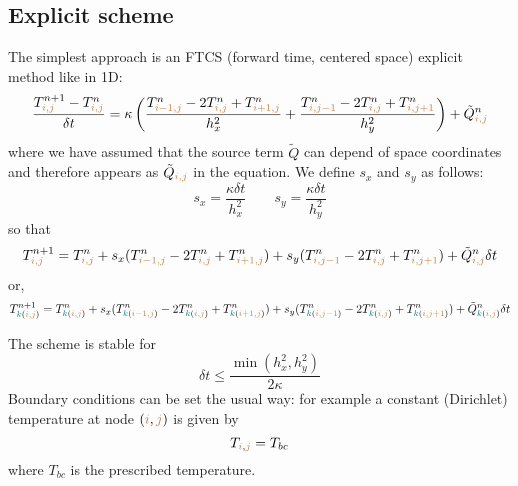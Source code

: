 \subsection{Explicit scheme} The simplest approach is an {\color{olive} FTCS} 
(forward time, centered space) explicit method like in 1D:
\begin{equation}
\frac{T_{{\color{brown}i,j}}^{n+1}-T_{{\color{brown}i,j}}^n}{\delta t}
= \kappa
\left(
\frac{ T_{{\color{brown}i-1,j}}^{n}-2T_{{\color{brown}i,j}}^{n}+T_{{\color{brown}i+1,j}}^{n}  }{h_x^2} + 
\frac{ T_{{\color{brown}i,j-1}}^{n}-2T_{{\color{brown}i,j}}^{n}+T_{{\color{brown}i,j+1}}^{n}  }{h_y^2}
\right)
+\tilde{Q}_{{\color{brown}i,j}}^n
\end{equation}
where we have assumed that the source term $\tilde{Q}$ 
can depend of space coordinates and therefore 
appears as $\tilde{Q}_{{\color{brown}i,j}}$ in the equation.
We define $s_x$ and $s_y$ as follows:
\begin{equation}
s_x = \frac{\kappa \delta t}{h_x^2}
\quad\quad
s_y = \frac{\kappa \delta t}{h_y^2}
\end{equation}
so that
\begin{equation}
T_{{\color{brown}i,j}}^{n+1} = T_{{\color{brown}i,j}}^n 
+ s_x ( T_{{\color{brown}i-1,j}}^{n}
-2T_{{\color{brown}i,j}}^{n}
+T_{{\color{brown}i+1,j}}^{n} ) 
+s_y ( T_{{\color{brown}i,j-1}}^{n}
-2T_{{\color{brown}i,j}}^{n}
+T_{{\color{brown}i,j+1}}^{n} ) + 
\tilde{Q}_{{\color{brown}i,j}}^n \delta t
\end{equation}
or, 
\begin{equation}
T_{{\color{teal}k}({\color{brown}i,j})}^{n+1} = 
T_{{\color{teal}k}({\color{brown}i,j})}^n 
+ s_x ( T_{{\color{teal}k}({\color{brown}i-1,j})}^{n}
-2T_{{\color{teal}k}({\color{brown}i,j})}^{n}
+T_{{\color{teal}k}({\color{brown}i+1,j})}^{n} ) 
+s_y ( T_{{\color{teal}k}({\color{brown}i,j-1})}^{n}
-2T_{{\color{teal}k}({\color{brown}i,j})}^{n}
+T_{{\color{teal}k}({\color{brown}i,j+1})}^{n} ) + 
\tilde{Q}_{{\color{teal}k}({\color{brown}i,j})}^n \delta t
\end{equation}



The scheme is stable for  
\begin{equation}
\delta t \leq \frac{\min(h_x^2,h_y^2)}{2 \kappa}
\end{equation}
Boundary conditions can be set the usual way: for example a constant (Dirichlet) temperature 
at node $({\color{brown}i},{\color{brown}j})$ is given by
\begin{equation}
T_{{\color{brown}i},{\color{brown}j}}=T_{bc} 
\end{equation}
where $T_{bc}$ is the prescribed temperature. 

